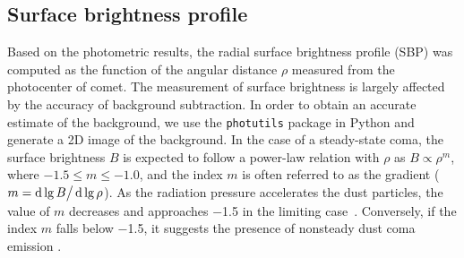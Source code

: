 

\subsection{Surface brightness profile}

Based on the photometric results, the radial surface brightness profile (SBP) was computed as the function of the angular distance $\rho$ measured from the photocenter of comet. The measurement of surface brightness is largely affected by the accuracy of background subtraction. In order to obtain an accurate estimate of the background, we use the \texttt{photutils} package in Python and generate a 2D image of the background. 
In the case of a steady-state coma, the surface brightness $B$ is expected to follow a power-law relation with $\rho$ as $B \propto \rho^m$, where $-1.5 \leqslant m \leqslant -1.0$, and the index $m$ is often referred to as the gradient ($m=\mathop{}\!\mathrm{d}\lg{B} \big/ \mathop{}\!\mathrm{d}\lg{\rho}$). As the radiation pressure accelerates the dust particles, the value of $m$ decreases and approaches \num{-1.5} in the limiting case~\citep{jewitt_surface_1987}. Conversely, if the index $m$ falls below \num{-1.5}, it suggests the presence of nonsteady dust coma emission \citep{lowry_ccd_1999}.

